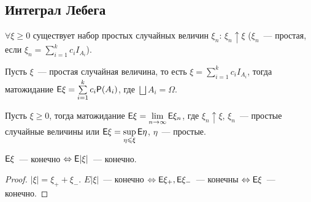 \subsection{Интеграл Лебега}
\begin{lemma}[][б/д]
	$\forall \xi \geqslant 0$ существует набор простых случайных величин $\xi_n$: $\xi_n \uparrow \xi$ ($\xi_n$~--- простая, если $\xi_n = \sum\limits_{i = 1}^k c_iI_{A_i}$).
\end{lemma}
\begin{definition}
	Пусть $\xi$~--- простая случайная величина, то есть $\xi = \sum\limits_{i = 1}^k c_iI_{A_i}$, тогда матожидание $\mathsf{E} \xi = \sum\limits_{i = 1}^k c_i\mathsf{P}(A_i)$, где $\bigsqcup A_i = \Omega$.
\end{definition}
\begin{definition}
	Пусть $\xi \geqslant 0$, тогда матожидание $\mathsf{E} \xi = \lim\limits_{n \rightarrow \infty} \mathsf{E} \xi_n$, где $\xi_n \uparrow \xi$, $\xi_n$~--- простые случайные величины или $\mathsf{E} \xi = \sup\limits_{\eta \leqslant \xi}\mathsf{E}\eta$, $\eta$~--- простые. 
\end{definition}
\begin{consequence}
	$\mathsf{E} \xi$~--- конечно $\Leftrightarrow \mathsf{E}|\xi|$~--- конечно.
	\begin{proof}
		$|\xi| = \xi_+ + \xi_-$. $E|\xi|$~--- конечно $\Leftrightarrow \mathsf{E}\xi_+, \mathsf{E}\xi_-$~--- конечны $\Leftrightarrow \mathsf{E}\xi$~--- конечно.
	\end{proof}
\end{consequence}
